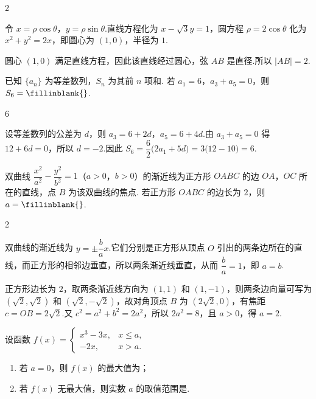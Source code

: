 \begin{answer}
2
\end{answer}

\begin{solution}
令 \(x=\rho\cos\theta\)，\(y=\rho\sin\theta\).直线方程化为 \(x-\sqrt3y=1\)，圆方程 \(\rho=2\cos\theta\) 化为 \(x^2+y^2=2x\)，即圆心为 \((1,0)\)，半径为 \(1\).

圆心 \((1,0)\) 满足直线方程，因此该直线经过圆心，弦 \(AB\) 是直径.所以 \(|AB|=2\).
\end{solution}

\begin{problem}
已知 \(\{a_n\}\) 为等差数列，\(S_n\) 为其前 \(n\) 项和. 若 \(a_1=6\)，\(a_3+a_5=0\)，则 \(S_6=\fillinblank{}\).
\end{problem}

\begin{answer}
6
\end{answer}

\begin{solution}
设等差数列的公差为 \(d\)，则 \(a_3=6+2d\)，\(a_5=6+4d\).由 \(a_3+a_5=0\) 得
\(12+6d=0\)，所以 \(d=-2\).因此
\(S_6=\dfrac{6}{2}\bigl(2a_1+5d\bigr)=3\bigl(12-10\bigr)=6\).
\end{solution}

\begin{problem}
双曲线 \(\dfrac{x^2}{a^2}-\dfrac{y^2}{b^2}=1\)（\(a>0\)，\(b>0\)）的渐近线为正方形 \(OABC\) 的边 \(OA\)，\(OC\) 所在的直线，点 \(B\) 为该双曲线的焦点. 若正方形 \(OABC\) 的边长为 \(2\)，则 \(a=\fillinblank{}\).
\end{problem}

\begin{answer}
2
\end{answer}

\begin{solution}
双曲线的渐近线为 \(y=\pm\dfrac ba x\).它们分别是正方形从顶点 \(O\) 引出的两条边所在的直线，而正方形的相邻边垂直，所以两条渐近线垂直，从而 \(\dfrac ba=1\)，即 \(a=b\).

正方形边长为 \(2\)，取两条渐近线方向为 \((1,1)\) 和 \((1,-1)\)，则两条边向量可写为 \((\sqrt2,\sqrt2)\) 和 \((\sqrt2,-\sqrt2)\)，故对角顶点 \(B\) 为 \((2\sqrt2,0)\)，有焦距 \(c=OB=2\sqrt2\).又 \(c^2=a^2+b^2=2a^2\)，所以 \(2a^2=8\)，且 \(a>0\)，得 \(a=2\).
\end{solution}

\begin{problem}
设函数
\(f(x)=\begin{cases}
x^3-3x, & x\le a,\\
-2x, & x>a.
\end{cases}\)

\begin{enumerate}
\item 若 \(a=0\)，则 \(f(x)\) 的最大值为\fillinblank{}；
\item 若 \(f(x)\) 无最大值，则实数 \(a\) 的取值范围是\fillinblank{}.
\end{enumerate}
\end{problem}

